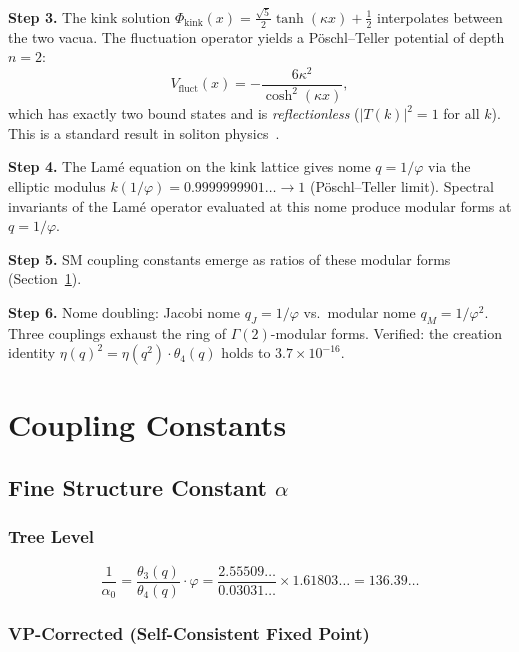 \documentclass[11pt,a4paper]{article}
\newcommand{\vp}{\varphi}
\begin{document}
\medskip
\noindent\textbf{Step 3.} \quad The kink solution
$\Phi_{\mathrm{kink}}(x) = \frac{\sqrt{5}}{2}\tanh(\kappa x) + \frac{1}{2}$
interpolates between the two vacua.  The fluctuation operator yields a
P\"oschl--Teller potential of depth $n = 2$:
\begin{equation}
  V_{\mathrm{fluct}}(x) = -\frac{6\kappa^2}{\cosh^2(\kappa x)},
\end{equation}
which has exactly two bound states and is \emph{reflectionless}
($|T(k)|^2 = 1$ for all $k$).  This is a standard result in
soliton physics~\cite{Rajaraman1982}.

\medskip
\noindent\textbf{Step 4.} \quad The Lam\'e equation on the kink lattice gives nome
$q = 1/\vp$ via the elliptic modulus $k(1/\vp) = 0.9999999901\ldots \to 1$
(P\"oschl--Teller limit).  Spectral invariants of the Lam\'e operator
evaluated at this nome produce modular forms at $q = 1/\vp$.

\medskip
\noindent\textbf{Step 5.} \quad SM coupling constants emerge as ratios of these
modular forms (Section~\ref{sec:couplings}).

\medskip
\noindent\textbf{Step 6.} \quad Nome doubling: Jacobi nome $q_J = 1/\vp$ vs.\
modular nome $q_M = 1/\vp^2$.  Three couplings exhaust the ring of
$\Gamma(2)$-modular forms.  Verified: the creation identity
$\eta(q)^2 = \eta(q^2)\cdot\theta_4(q)$ holds to $3.7\times 10^{-16}$.

\section{Coupling Constants}
\label{sec:couplings}

\subsection{Fine Structure Constant $\alpha$}

\subsubsection{Tree Level}

\begin{equation}
  \frac{1}{\alpha_0} = \frac{\theta_3(q)}{\theta_4(q)}\cdot\vp
  = \frac{2.55509\ldots}{0.03031\ldots}\times 1.61803\ldots
  = 136.39\ldots
\end{equation}

\subsubsection{VP-Corrected (Self-Consistent Fixed Point)}
\end{document}
